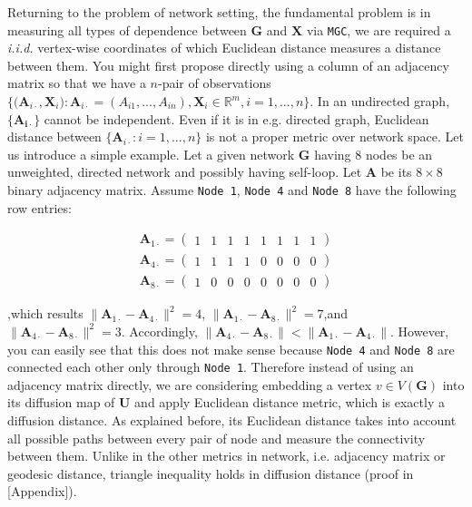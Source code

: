 \documentclass[12pt]{article}
\theoremstyle{definition}
\begin{document}
Returning to the problem of network setting, the fundamental problem is in measuring all types of dependence between $\boldsymbol{G}$ and $\boldsymbol{X}$ via \texttt{MGC}, we are required a \textit{i.i.d.} vertex-wise coordinates of which Euclidean distance measures a distance between them. You might first propose directly using a column of an adjacency matrix so that we have a $n$-pair of observations $\big\{ \big( \boldsymbol{A}_{i \cdot} , \boldsymbol{X}_{i} \big) : \boldsymbol{A}_{i \cdot} = (A_{i 1} , ... , A_{i n} ), \boldsymbol{X}_{i} \in \mathbb{R}^{m}, i=1,...,n  \big\}.$ In an undirected graph, $\{ \mathbf{A_{i \cdot}}  \}$ cannot be independent. Even if it is in e.g. directed graph, Euclidean distance between $\{ \boldsymbol{A}_{i \cdot} : i =1, ... , n \}$ is not a proper metric over network space. Let us introduce a simple example. Let a given network $\boldsymbol{G}$ having 8 nodes be an unweighted, directed network and possibly having self-loop. Let $\boldsymbol{A}$ be its $8 \times 8$ binary adjacency matrix. Assume \texttt{Node 1}, \texttt{Node 4} and \texttt{Node 8} have the following row entries:

\begin{equation}
\begin{gathered}
\boldsymbol{A}_{1 \cdot} = \left( \begin{array}{rrrrrrrr} 1 & 1 & 1 & 1 & 1 & 1 & 1 & 1 \end{array} \right) \\
\boldsymbol{A}_{4 \cdot} = \left( \begin{array}{rrrrrrrr} 1 & 1 & 1 & 1 & 0 & 0 & 0 & 0 \end{array} \right) \\
\boldsymbol{A}_{8 \cdot} = \left( \begin{array}{rrrrrrrr} 1 & 0 & 0 & 0 & 0 & 0 & 0 & 0 \end{array} \right)
\end{gathered}
\end{equation}

,which results $\parallel \boldsymbol{A}_{1 \cdot} -\boldsymbol{A}_{4 \cdot} \parallel^2 = 4$, $\parallel \boldsymbol{A}_{1 \cdot} -\boldsymbol{A}_{8 \cdot} \parallel^2 = 7$,and $\parallel \boldsymbol{A}_{4 \cdot} -\boldsymbol{A}_{8 \cdot} \parallel^2 = 3.$ Accordingly, $\parallel \boldsymbol{A}_{4 \cdot} -\boldsymbol{A}_{8 \cdot} \parallel  < \parallel \boldsymbol{A}_{1 \cdot} -\boldsymbol{A}_{4 \cdot} \parallel$. However, you can easily see that this does not make sense because \texttt{Node 4} and \texttt{Node 8} are connected each other only through \texttt{Node 1}. 
Therefore instead of using an adjacency matrix directly, we are considering embedding a vertex $v \in V(\boldsymbol{G})$ into its diffusion map of $\boldsymbol{U}$ and apply Euclidean distance metric, which is exactly a diffusion distance. As explained before, its Euclidean distance takes into account all possible paths between every pair of node and measure the connectivity between them. Unlike in the other metrics in network, i.e. adjacency matrix or geodesic distance, triangle inequality holds in diffusion distance (proof in [Appendix]). 
\end{document}
